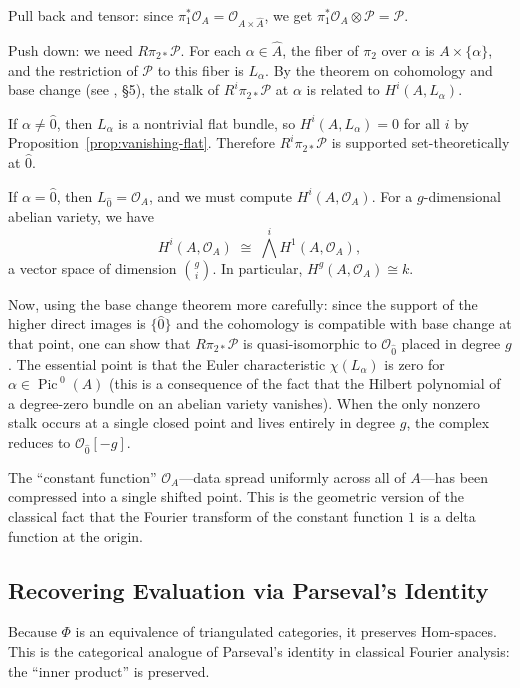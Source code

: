 \documentclass{article}
\newcommand{\CO}{{\mathcal{O}}}
\newcommand{\CP}{{\mathcal{P}}}
\newcommand{\Pic}{{\operatorname{Pic}\,}}
\begin{document}
\begin{Proof}
Pull back and tensor: since $\pi_1^*\CO_A = \CO_{A \times \hat{A}}$, we get $\pi_1^*\CO_A \otimes \CP = \CP$.

Push down: we need $R\pi_{2*}\CP$. For each $\alpha \in \hat{A}$, the fiber of $\pi_2$ over $\alpha$ is $A \times \{\alpha\}$, and the restriction of $\CP$ to this fiber is $L_\alpha$. By the theorem on cohomology and base change (see \cite{mumford-av}, \S5), the stalk of $R^i\pi_{2*}\CP$ at $\alpha$ is related to $H^i(A, L_\alpha)$.

If $\alpha \neq \hat{0}$, then $L_\alpha$ is a nontrivial flat bundle, so $H^i(A, L_\alpha) = 0$ for all $i$ by Proposition~\ref{prop:vanishing-flat}. Therefore $R^i\pi_{2*}\CP$ is supported set-theoretically at $\hat{0}$.

If $\alpha = \hat{0}$, then $L_{\hat{0}} = \CO_A$, and we must compute $H^i(A, \CO_A)$. For a $g$-dimensional abelian variety, we have
\[
    H^i(A, \CO_A) \;\cong\; \bigwedge^i H^1(A, \CO_A),
\]
a vector space of dimension $\binom{g}{i}$. In particular, $H^g(A, \CO_A) \cong k$.

Now, using the base change theorem more carefully: since the support of the higher direct images is $\{\hat{0}\}$ and the cohomology is compatible with base change at that point, one can show that $R\pi_{2*}\CP$ is quasi-isomorphic to $\CO_{\hat{0}}$ placed in degree $g$. The essential point is that the Euler characteristic $\chi(L_\alpha)$ is zero for $\alpha \in \Pic^0(A)$ (this is a consequence of the fact that the Hilbert polynomial of a degree-zero bundle on an abelian variety vanishes). When the only nonzero stalk occurs at a single closed point and lives entirely in degree $g$, the complex reduces to $\CO_{\hat{0}}[-g]$.
\end{Proof}

The ``constant function'' $\CO_A$---data spread uniformly across all of $A$---has been compressed into a single shifted point. This is the geometric version of the classical fact that the Fourier transform of the constant function $1$ is a delta function at the origin.


\subsection{Recovering Evaluation via Parseval's Identity}

Because $\Phi$ is an equivalence of triangulated categories, it preserves Hom-spaces. This is the categorical analogue of Parseval's identity in classical Fourier analysis: the ``inner product'' is preserved.
\end{document}
